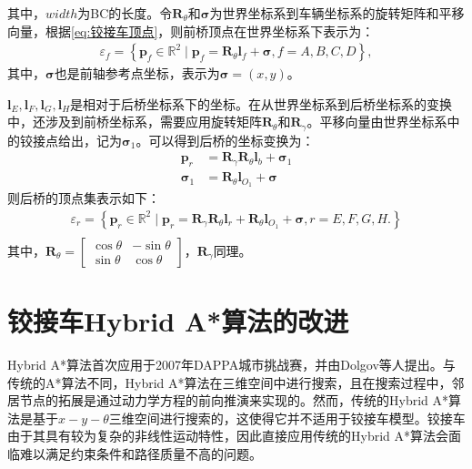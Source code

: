 \documentclass[master,academic]{ysuthesis} %
\begin{document}
	其中，$width$为BC的长度。令$\bm{R}_\theta$和$\bm{\sigma}$为世界坐标系到车辆坐标系的旋转矩阵和平移向量，根据\ref{eq:铰接车顶点}，则前桥顶点在世界坐标系下表示为：
	\begin{equation}
	\begin{aligned}
		\varepsilon_f = \left\{ \bm{p}_f \in \mathbb{R}^2 \mid \bm{p}_f=\bm{R}_\theta \bm{l}_f+\bm{\sigma},  f = A,B,C,D \right\},
	\end{aligned} 
	\end{equation}
	其中，$\bm{\sigma}$也是前轴参考点坐标，表示为$\bm{\sigma}=(x,y)$。
	
	$\bm{l}_E,\bm{l}_F,\bm{l}_G,\bm{l}_H$是相对于后桥坐标系下的坐标。在从世界坐标系到后桥坐标系的变换中，还涉及到前桥坐标系，需要应用旋转矩阵$\bm{R}_\theta$和$\bm{R}_\gamma$。平移向量由世界坐标系中的铰接点给出，记为$\bm{\sigma}_1$。可以得到后桥的坐标变换为： 
	\begin{equation}
		\begin{aligned}
				\bm{p}_r&=\bm{R}_\gamma \bm{R}_\theta \bm{l}_b+\bm{\sigma}_1\\
				\bm{\sigma}_1&=\bm{R}_\theta \bm{l}_{O_1}+\bm{\sigma}
		\end{aligned}
	\end{equation}
	则后桥的顶点集表示如下：
	\begin{equation}
		\begin{aligned}
			\varepsilon_r = \left\{ \bm{p}_r \in \mathbb{R}^2 \mid \bm{p}_r=\bm{R}_\gamma \bm{R}_\theta \bm{l}_r+\bm{R}_\theta \bm{l}_{O_1}+\bm{\sigma},r = E,F,G,H.  \right\} \\
		\end{aligned}
	\end{equation}
	其中，$\bm{R}_\theta = \begin{bmatrix}
		\cos\theta &-\sin\theta\\
		\sin\theta &\cos\theta
	\end{bmatrix}$，$\bm{R}_\gamma$同理。

	
	\section{铰接车Hybrid A*算法的改进}
	Hybrid A*算法首次应用于2007年DAPPA城市挑战赛，并由Dolgov等人提出。与传统的A*算法不同，Hybrid A*算法在三维空间中进行搜索，且在搜索过程中，邻居节点的拓展是通过动力学方程的前向推演来实现的。然而，传统的Hybrid A*算法是基于$x-y-\theta$三维空间进行搜索的，这使得它并不适用于铰接车模型。铰接车由于其具有较为复杂的非线性运动特性，因此直接应用传统的Hybrid A*算法会面临难以满足约束条件和路径质量不高的问题。
\end{document}
